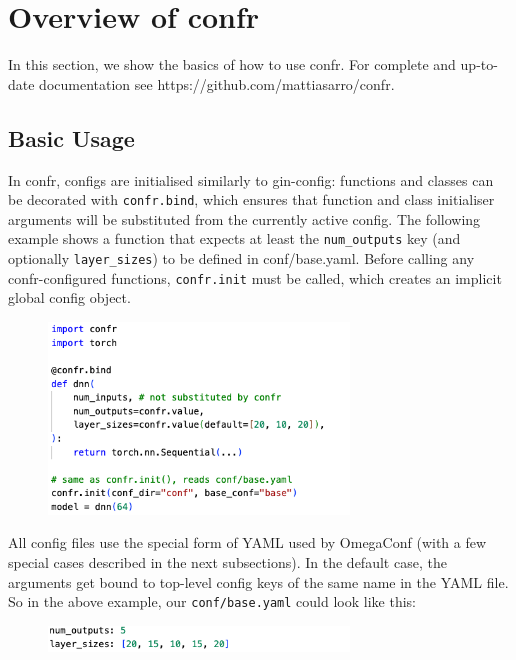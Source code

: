 \documentclass{itatnew}
\begin{document}
\section{Overview of confr}

In this section, we show the basics of how to use confr. For complete and up-to-date documentation see https://github.com/mattiasarro/confr.

\subsection{Basic Usage}

In confr, configs are initialised similarly to gin-config: functions and classes can be decorated with \texttt{confr.bind}, which ensures that function and class initialiser arguments will be substituted from the currently active config. The following example shows a function that expects at least the \texttt{num_outputs} key (and optionally \texttt{layer_sizes}) to be defined in conf/base.yaml. Before calling any confr-configured functions, \texttt{confr.init} must be called, which creates an implicit global config object.

\begin{figure}[H]
    \centering
    \includegraphics[width=8cm]{c1.png}
\end{figure}

All config files use the special form of YAML used by OmegaConf (with a few special cases described in the next subsections). In the default case, the arguments get bound to top-level config keys of the same name in the YAML file. So in the above example, our \texttt{conf/base.yaml} could look like this:

\begin{figure}[H]
    \centering
    \includegraphics[width=8cm]{c2.png}
\end{figure}
\end{document}
